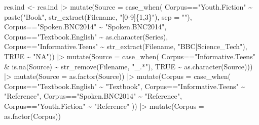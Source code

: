 \documentclass[
  letterpaper,
  DIV=11,
  numbers=noendperiod]{scrreprt}
\newenvironment{Shaded}{\begin{snugshade}}{\end{snugshade}}
\newcommand{\AttributeTok}[1]{\textcolor[rgb]{0.40,0.45,0.13}{#1}}
\newcommand{\ConstantTok}[1]{\textcolor[rgb]{0.56,0.35,0.01}{#1}}
\newcommand{\FunctionTok}[1]{\textcolor[rgb]{0.28,0.35,0.67}{#1}}
\newcommand{\NormalTok}[1]{\textcolor[rgb]{0.00,0.23,0.31}{#1}}
\newcommand{\OtherTok}[1]{\textcolor[rgb]{0.00,0.23,0.31}{#1}}
\newcommand{\SpecialCharTok}[1]{\textcolor[rgb]{0.37,0.37,0.37}{#1}}
\newcommand{\StringTok}[1]{\textcolor[rgb]{0.13,0.47,0.30}{#1}}
\begin{document}
\begin{Shaded}
\begin{Highlighting}[]
\NormalTok{res.ind }\OtherTok{\textless{}{-}}\NormalTok{ res.ind }\SpecialCharTok{|\textgreater{}} 
  \FunctionTok{mutate}\NormalTok{(}\AttributeTok{Source =} \FunctionTok{case\_when}\NormalTok{(}
\NormalTok{  Corpus}\SpecialCharTok{==}\StringTok{"Youth.Fiction"} \SpecialCharTok{\textasciitilde{}} \FunctionTok{paste}\NormalTok{(}\StringTok{"Book"}\NormalTok{, }\FunctionTok{str\_extract}\NormalTok{(Filename, }\StringTok{"[0{-}9]\{1,3\}"}\NormalTok{), }\AttributeTok{sep =} \StringTok{""}\NormalTok{),}
\NormalTok{  Corpus}\SpecialCharTok{==}\StringTok{"Spoken.BNC2014"} \SpecialCharTok{\textasciitilde{}} \StringTok{"Spoken.BNC2014"}\NormalTok{,}
\NormalTok{  Corpus}\SpecialCharTok{==}\StringTok{"Textbook.English"} \SpecialCharTok{\textasciitilde{}} \FunctionTok{as.character}\NormalTok{(Series),}
\NormalTok{  Corpus}\SpecialCharTok{==}\StringTok{"Informative.Teens"} \SpecialCharTok{\textasciitilde{}} \FunctionTok{str\_extract}\NormalTok{(Filename, }\StringTok{"BBC|Science\_Tech"}\NormalTok{),}
  \ConstantTok{TRUE} \SpecialCharTok{\textasciitilde{}} \StringTok{"NA"}\NormalTok{)) }\SpecialCharTok{|\textgreater{}} 
  \FunctionTok{mutate}\NormalTok{(}\AttributeTok{Source =} \FunctionTok{case\_when}\NormalTok{(}
\NormalTok{  Corpus}\SpecialCharTok{==}\StringTok{"Informative.Teens"} \SpecialCharTok{\&} \FunctionTok{is.na}\NormalTok{(Source) }\SpecialCharTok{\textasciitilde{}} \FunctionTok{str\_remove}\NormalTok{(Filename, }\StringTok{"\_.*"}\NormalTok{),}
  \ConstantTok{TRUE} \SpecialCharTok{\textasciitilde{}} \FunctionTok{as.character}\NormalTok{(Source))) }\SpecialCharTok{|\textgreater{}} 
  \FunctionTok{mutate}\NormalTok{(}\AttributeTok{Source =} \FunctionTok{as.factor}\NormalTok{(Source)) }\SpecialCharTok{|\textgreater{}} 
  \FunctionTok{mutate}\NormalTok{(}\AttributeTok{Corpus =} \FunctionTok{case\_when}\NormalTok{(}
\NormalTok{    Corpus}\SpecialCharTok{==}\StringTok{"Textbook.English"} \SpecialCharTok{\textasciitilde{}} \StringTok{"Textbook"}\NormalTok{,}
\NormalTok{    Corpus}\SpecialCharTok{==}\StringTok{"Informative.Teens"} \SpecialCharTok{\textasciitilde{}} \StringTok{"Reference"}\NormalTok{,}
\NormalTok{    Corpus}\SpecialCharTok{==}\StringTok{"Spoken.BNC2014"} \SpecialCharTok{\textasciitilde{}} \StringTok{"Reference"}\NormalTok{,}
\NormalTok{    Corpus}\SpecialCharTok{==}\StringTok{"Youth.Fiction"} \SpecialCharTok{\textasciitilde{}} \StringTok{"Reference"}
\NormalTok{  )) }\SpecialCharTok{|\textgreater{}} 
  \FunctionTok{mutate}\NormalTok{(}\AttributeTok{Corpus =} \FunctionTok{as.factor}\NormalTok{(Corpus))}


\end{Highlighting}
\end{Shaded}
\end{document}
